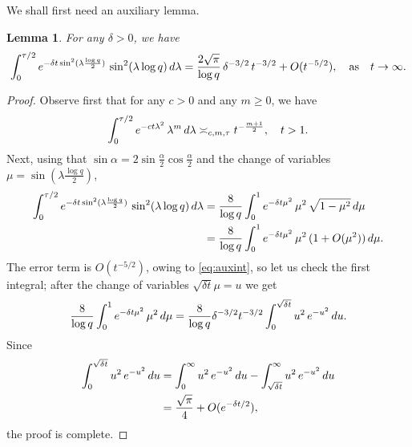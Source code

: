 \documentclass[11pt,a4paper,reqno]{amsart}
\theoremstyle{plain}
\newtheorem{lemma}[theorem]{Lemma}
\theoremstyle{remark}
\theoremstyle{definition}
\theoremstyle{remark}
\numberwithin{equation}{section}
\def\int{\intop\nolimits}
\begin{document}
	We shall first need an auxiliary lemma.
	\begin{lemma}\label{lemma:Step5}
		For any $\delta>0$, we have 
		\[
		\int_{0}^{\tau/2} e^{-\delta t \sin^2(\lambda \frac{\log q}{2})}\,\sin^2(\lambda \log q)\, d\lambda= \frac{2\sqrt{\pi}}{\log q}\, \delta^{-3/2}\, t^{-3/2} +O(t^{-5/2}), \quad \text{as} \quad t\to \infty. 
		\]
	\end{lemma}
	\begin{proof}
		Observe first that for any $c>0$ and any $m\geq 0$, we have
		\begin{equation}\label{eq:auxint}
			\int_{0}^{\tau/2} e^{-ct\lambda^2}\, \lambda^{m}\, d\lambda \asymp_{c,m, \tau} t^{-\frac{m+1}{2}}, \quad t>1.
		\end{equation}
		Next, using that $\sin \alpha=2\sin\frac{\alpha}{2}\cos\frac{\alpha}{2} $ and the change of variables $\mu=\sin(\lambda \frac{\log q}{2})$, 
		\begin{align*}
			\int_{0}^{\tau/2} e^{-\delta t \sin^2(\lambda \frac{\log q}{2})}\,\sin^2(\lambda \log q)\, d\lambda&=\frac{8}{\log q}\int_{0}^{1} e^{-\delta t\mu^2}\,\mu^2\, \sqrt{1-\mu^2}\, d\mu\\
			&=\frac{8}{\log q}\int_{0}^{1} e^{-\delta t\mu^2}\,\mu^2\, (1+O(\mu^2)) \, d\mu.
		\end{align*}
		The error term is $O(t^{-5/2})$, owing to \eqref{eq:auxint}, so let us check the first integral; after the change of variables $\sqrt{\delta t}\mu=u$ we get
		\begin{align*}\frac{8}{\log q}\int_{0}^{1} e^{-\delta t\mu^2}\,\mu^2\, d\mu=\frac{8}{\log q}\delta^{-3/2}t^{-3/2}\int_{0}^{\sqrt{\delta t}}u^2\, e^{-u^2}\, du.
		\end{align*}
		Since
		\begin{align*}
			\int_{0}^{\sqrt{\delta t}}u^2\, e^{-u^2}\, du&=\int_0^{\infty}u^2\, e^{-u^2}\, du-\int_{\sqrt{\delta t}}^{\infty}u^2\, e^{-u^2}\, du\\
			&=\frac{\sqrt{\pi}}{4}+O(e^{-\delta t/2}),
		\end{align*}
		the proof is complete.
	\end{proof}
	
\end{document}
